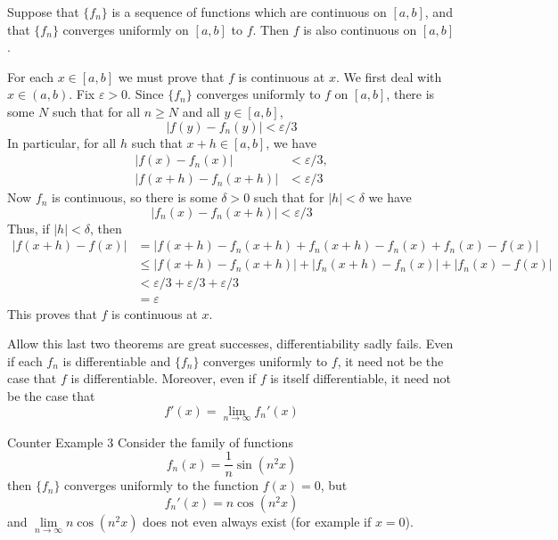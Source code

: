 \documentclass[12pt]{report}
\begin{document}
\begin{thm}{}{}
    Suppose that $\{f_n\}$ is a sequence of functions which are continuous on $[a,b]$, and that $\{f_n\}$ converges uniformly on $[a,b]$ to $f$. Then $f$ is also continuous on $[a,b]$.
\end{thm}
\begin{proof*}{}{}
    For each $x \in [a,b]$ we must prove that $f$ is continuous at $x$. We first deal with $x \in (a,b)$. Fix $\varepsilon > 0$. Since $\{f_n\}$ converges uniformly to $f$ on $[a,b]$, there is some $N$ such that for all $n \geq N$ and all $y \in [a,b]$, \begin{equation*}
        |f(y) - f_n(y)| < \varepsilon/3
    \end{equation*}
    In particular, for all $h$ such that $x+ h \in [a,b]$, we have \begin{align*}
        |f(x) - f_n(x)| &< \varepsilon/3, \\
        |f(x+h) - f_n(x+h)| &< \varepsilon/3
    \end{align*}
    Now $f_n$ is continuous, so there is some $\delta > 0$ such that for $|h| < \delta$ we have \begin{equation*}
        |f_n(x) - f_n(x+h)| < \varepsilon/3
    \end{equation*}
    Thus, if $|h| < \delta$, then \begin{align*}
        |f(x+h)-f(x)| &= |f(x+h)-f_n(x+h)+f_n(x+h) - f_n(x)+f_n(x)-f(x)| \\
        &\leq |f(x+h) - f_n(x+h)| + |f_n(x+h)-f_n(x)| + |f_n(x) - f(x)| \\
        &<\varepsilon/3 + \varepsilon/3 + \varepsilon/3 \\
        &= \varepsilon
    \end{align*}
    This proves that $f$ is continuous at $x$.
\end{proof*}

\begin{rmk}{}{}
    Allow this last two theorems are great successes, differentiability sadly fails. Even if each $f_n$ is differentiable and $\{f_n\}$ converges uniformly to $f$, it need not be the case that $f$ is differentiable. Moreover, even if $f$ is itself differentiable, it need not be the case that \begin{equation*}
        f'(x) = \lim\limits_{n\rightarrow \infty}f_n'(x)
    \end{equation*}
\end{rmk}

\begin{eg*}{Counter Example 3}{}
    Consider the family of functions \begin{equation*}
        f_n(x) = \frac{1}{n}\sin(n^2x)
    \end{equation*}
    then $\{f_n\}$ converges uniformly to the function $f(x) = 0$, but \begin{equation*}
        f_n'(x) = n\cos(n^2x)
    \end{equation*}
    and $\lim\limits_{n\rightarrow\infty}n\cos(n^2x)$ does not even always exist (for example if $x =0$).
\end{eg*}
\end{document}
